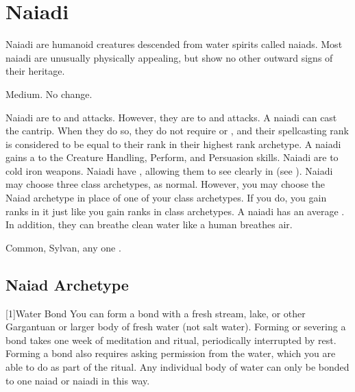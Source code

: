 \section{Naiadi}
  Naiadi are humanoid creatures descended from water spirits called naiads.
  Most naiadi are unusually physically appealing, but show no other outward signs of their heritage.

   Medium.
   No change.
  \begin{raggeditemize}
     Naiadi are \impervious to \atFire and \atWater attacks.
      However, they are \vulnerable to \atCold and \atElectricity attacks.
     A naiadi can cast the  cantrip.
      When they do so, they do not require  or , and their spellcasting rank is considered to be equal to their rank in their highest rank archetype.
     A naiadi gains a   to the Creature Handling, Perform, and Persuasion skills.
     Naiadi are \vulnerable to cold iron weapons.
     Naiadi have , allowing them to see clearly in  (see ).
     Naiadi may choose three class archetypes, as normal.
      However, you may choose the Naiad archetype in place of one of your class archetypes.
      If you do, you gain ranks in it just like you gain ranks in class archetypes.
     A naiadi has an average .
      In addition, they can breathe clean water like a human breathes air.
  \end{raggeditemize}
   Common, Sylvan, any one .

  \subsection{Naiad Archetype}

    [1]{Water Bond} You can form a bond with a fresh stream, lake, or other Gargantuan or larger body of fresh water (not salt water).
      Forming or severing a bond takes one week of meditation and ritual, periodically interrupted by rest.
      Forming a bond also requires asking permission from the water, which you are able to do as part of the ritual.
      Any individual body of water can only be bonded to one naiad or naiadi in this way.


